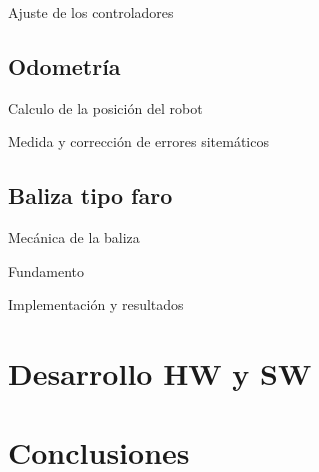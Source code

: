 \documentclass{beamer}
\begin{document}
\begin{frame}{Ajuste de los controladores}
\end{frame}

\subsection{Odometría}

\begin{frame}{Calculo de la posición del robot}
\end{frame}

\begin{frame}{Medida y corrección de errores sitemáticos}
\end{frame}


\subsection{Baliza tipo faro}

\begin{frame}{Mecánica de la baliza}
\begin{center}
\end{center}
\end{frame}

\begin{frame}{Fundamento}
\begin{center}
\end{center}

\end{frame}

\begin{frame}{Implementación y resultados}
\begin{center}
\end{center}
\end{frame}


\section{Desarrollo HW y SW}

\appendix
\section*{Conclusiones}
\end{document}
